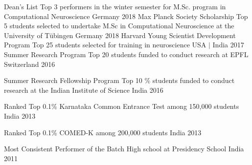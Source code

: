 \begin{cvhonors}
  \cvhonor
    {Dean's List} %
    {Top 3 performers in the winter semester for M.Sc. program in Computational Neuroscience} %
    {Germany} %
    {2018} %
    \cvhonor
    {Max Planck Society Scholarship} %
    {Top 5 students selected to undertake M.Sc in Computational Neuroscience at the University of Tübingen} %
    {Germany} %
    {2018} %
  \cvhonor
    {Harvard Young Scientist Development Program} %
    {Top 25 students selected for training in neuroscience} %
    {USA $\mid$ India} %
    {2017} %
  \cvhonor
    {Summer Research Program} %
    {Top 20 students funded to conduct research at EPFL} %
    {Switzerland} %
    {2016} %

  \cvhonor
    {Summer Research Fellowship Program} %
    {Top 10 \% students funded to conduct research at the Indian Institute of Science} %
    {India} %
    {2016} %

  \cvhonor
    {Ranked Top 0.1\%} %
    {Karnataka Common Entrance Test among 150,000 students} %
    {India} %
    {2013} %

  \cvhonor
    {Ranked Top 0.1\%} %
    {COMED-K among 200,000 students} %
    {India} %
    {2013} %
    
  \cvhonor
    {Most Consistent Performer of the Batch} %
    {High school at Presidency School} %
    {India} %
    {2011} %
\\
\end{cvhonors}


